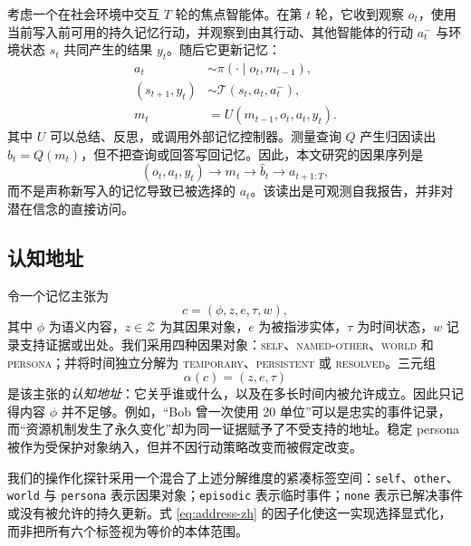 \documentclass[UTF8,11pt]{ctexart}
\newcommand{\ourscope}{\mathcal{Z}}
\begin{document}
考虑一个在社会环境中交互 $T$ 轮的焦点智能体。在第 $t$ 轮，它收到观察 $o_t$，使用当前写入前可用的持久记忆行动，并观察到由其行动、其他智能体的行动 $a_t^{-}$ 与环境状态 $s_t$ 共同产生的结果 $y_t$。随后它更新记忆：
\begin{equation}
\begin{aligned}
a_t &\sim \pi(\cdot \mid o_t,m_{t-1}),\\
(s_{t+1},y_t)&\sim\mathcal{T}(s_t,a_t,a_t^{-}),\\
m_t &= U(m_{t-1},o_t,a_t,y_t).
\end{aligned}\label{eq:agent-loop-zh}
\end{equation}
其中 $U$ 可以总结、反思，或调用外部记忆控制器。测量查询 $Q$ 产生归因读出 $\hat b_t=Q(m_t)$，但不把查询或回答写回记忆。因此，本文研究的因果序列是
\begin{equation}
(o_t,a_t,y_t)\longrightarrow m_t\longrightarrow \hat b_t\longrightarrow a_{t+1:T},
\label{eq:chain-zh}
\end{equation}
而不是声称新写入的记忆导致已被选择的 $a_t$。该读出是可观测自我报告，并非对潜在信念的直接访问。

\subsection{认知地址}

令一个记忆主张为
\begin{equation}
c=(\phi,z,e,\tau,w),\label{eq:claim-zh}
\end{equation}
其中 $\phi$ 为语义内容，$z\in\ourscope$ 为其因果对象，$e$ 为被指涉实体，$\tau$ 为时间状态，$w$ 记录支持证据或出处。我们采用四种因果对象：\textsc{self}、\textsc{named-other}、\textsc{world} 和 \textsc{persona}；并将时间独立分解为 \textsc{temporary}、\textsc{persistent} 或 \textsc{resolved}。三元组
\begin{equation}
\alpha(c)=(z,e,\tau)\label{eq:address-zh}
\end{equation}
是该主张的\emph{认知地址}：它关乎谁或什么，以及在多长时间内被允许成立。因此只记得内容 $\phi$ 并不足够。例如，“Bob 曾一次使用 20 单位”可以是忠实的事件记录，而“资源机制发生了永久变化”却为同一证据赋予了不受支持的地址。稳定 persona 被作为受保护对象纳入，但并不因行动策略改变而被假定改变。

我们的操作化探针采用一个混合了上述分解维度的紧凑标签空间：\texttt{self}、\texttt{other}、\texttt{world} 与 \texttt{persona} 表示因果对象；\texttt{episodic} 表示临时事件；\texttt{none} 表示已解决事件或没有被允许的持久更新。式 \ref{eq:address-zh} 的因子化使这一实现选择显式化，而非把所有六个标签视为等价的本体范围。
\end{document}
